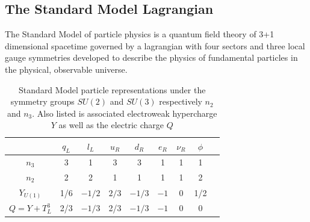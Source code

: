 \subsection{The Standard Model Lagrangian}

The Standard Model of particle physics is a quantum field theory of 3+1 dimensional 
spacetime governed by a lagrangian with four sectors and three local gauge symmetries
developed to describe the physics of fundamental particles in the physical, observable universe.  

\begin{center}
\begin{table}[]
\begin{center}
\caption{Standard Model particle representations under the symmetry groups $SU(2)$ and $SU(3)$ respectively $n_2$ and $n_3$. Also listed is associated electroweak hypercharge $Y$ as well as the electric charge $Q$ }
\begin{tabular}{ccccccccc}
                & $q_L$ & $l_L$  & $u_R$ & $d_R$  & $e_R$ & $\nu_R$ & $\phi$ \\
\hline
$n_3$           & 3     & 1      & 3     & 3      & 1     & 1  & 1     \\
$n_2$           & 2     & 2      & 1     & 1      & 1     & 1  & 2     \\
$Y_{U(1)}$      & 1/6   & $-1/2$ & $2/3$ & $-1/3$ & $-1$  & 0  & 1/2     \\
\hline
\hline
$Q = Y + T_L^3$ & 2/3   & $-1/3$ & 2/3   & $-1/3$ & $-1$  & 0 & 0
\end{tabular}
\end{center}
\label{tab:reps} 
\end{table}
\end{center}




